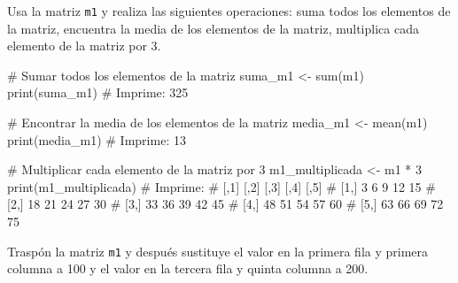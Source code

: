 \documentclass[
  letterpaper,
]{scrbook}
\newenvironment{Shaded}{\begin{snugshade}}{\end{snugshade}}
\newcommand{\CommentTok}[1]{\textcolor[rgb]{0.37,0.37,0.37}{#1}}
\newcommand{\DecValTok}[1]{\textcolor[rgb]{0.68,0.00,0.00}{#1}}
\newcommand{\FunctionTok}[1]{\textcolor[rgb]{0.28,0.35,0.67}{#1}}
\newcommand{\NormalTok}[1]{\textcolor[rgb]{0.00,0.23,0.31}{#1}}
\newcommand{\OtherTok}[1]{\textcolor[rgb]{0.00,0.23,0.31}{#1}}
\newcommand{\SpecialCharTok}[1]{\textcolor[rgb]{0.37,0.37,0.37}{#1}}
\begin{document}
Usa la matriz \texttt{m1} y realiza las siguientes operaciones: suma
todos los elementos de la matriz, encuentra la media de los elementos de
la matriz, multiplica cada elemento de la matriz por 3.

\begin{Shaded}
\begin{Highlighting}[]
\CommentTok{\# Sumar todos los elementos de la matriz}
\NormalTok{suma\_m1 }\OtherTok{\textless{}{-}} \FunctionTok{sum}\NormalTok{(m1)}
\FunctionTok{print}\NormalTok{(suma\_m1)}
\CommentTok{\# Imprime: 325}

\CommentTok{\# Encontrar la media de los elementos de la matriz}
\NormalTok{media\_m1 }\OtherTok{\textless{}{-}} \FunctionTok{mean}\NormalTok{(m1)}
\FunctionTok{print}\NormalTok{(media\_m1)}
\CommentTok{\# Imprime: 13}

\CommentTok{\# Multiplicar cada elemento de la matriz por 3}
\NormalTok{m1\_multiplicada }\OtherTok{\textless{}{-}}\NormalTok{ m1 }\SpecialCharTok{*} \DecValTok{3}
\FunctionTok{print}\NormalTok{(m1\_multiplicada)}
\CommentTok{\# Imprime:}
\CommentTok{\#      [,1] [,2] [,3] [,4] [,5]}
\CommentTok{\# [1,]    3    6    9   12   15}
\CommentTok{\# [2,]   18   21   24   27   30}
\CommentTok{\# [3,]   33   36   39   42   45}
\CommentTok{\# [4,]   48   51   54   57   60}
\CommentTok{\# [5,]   63   66   69   72   75}
\end{Highlighting}
\end{Shaded}

Traspón la matriz \texttt{m1} y después sustituye el valor en la primera
fila y primera columna a 100 y el valor en la tercera fila y quinta
columna a 200.
\end{document}
